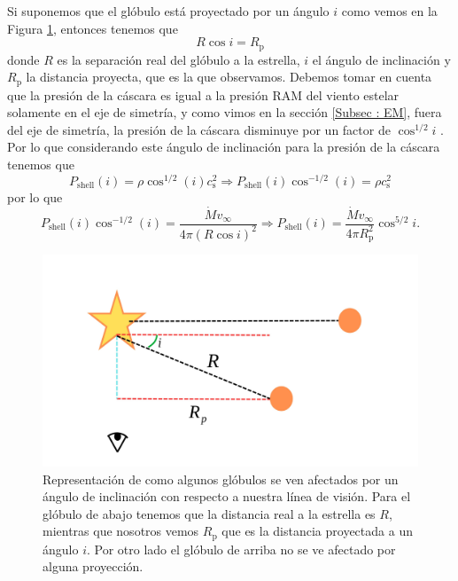 \documentclass{book}
\begin{document}
Si suponemos que el glóbulo está proyectado por un ángulo $i$ como vemos en la Figura \ref{Ang proyeccion}, entonces tenemos que 
\begin{equation}
R\cos i=R_\mathrm{p}
\end{equation}\label{eq:sep_real}
\noindent donde $R$ es la separación real del glóbulo a la estrella, $i$ el ángulo de inclinación y $R_\mathrm{p}$ la distancia proyecta, que es la que observamos. Debemos tomar en cuenta que la presión de la cáscara es igual a la presión RAM del viento estelar solamente en el eje de simetría, y como vimos en la sección \ref{Subsec : EM}, fuera del eje de simetría, la presión de la cáscara disminuye por un factor de $\cos^{1/2}i$ \citep{Tarango:2018}. Por lo que considerando este ángulo de inclinación para la presión de la cáscara tenemos que
\begin{equation}
    P_\mathrm{shell}(i)=\rho\cos^{1/2}(i) c_\mathrm{s}^2 \Rightarrow P_\mathrm{shell}(i)\cos^{-1/2}(i)=\rho c_\mathrm{s}^2 
\end{equation}
por lo que  
\begin{equation}
P_\mathrm{shell}(i)\cos^{-1/2}(i)=\frac{\dot{M}v_\infty}{4\pi (R\cos i)^2} \Rightarrow
P_\mathrm{shell}(i)=\frac{\dot{M}v_\infty}{4\pi R_\mathrm{p}^2}\cos^{5/2}i.
\end{equation}\label{eq:cos 5_2}

\begin{figure}[htb]
    \centering
    \includegraphics[width=\textwidth]{artesanales/ImgFi01-6.pdf}
    \caption{Representación de como algunos glóbulos se ven afectados por un ángulo de inclinación con respecto a nuestra línea de visión. Para el glóbulo de abajo tenemos que la distancia real a la estrella es $R$, mientras que nosotros vemos $R_\mathrm{p}$ que es la distancia proyectada a un ángulo $i$. Por otro lado el glóbulo de arriba no se ve afectado por alguna proyección.}
    \label{Ang proyeccion}
\end{figure}
\end{document}
